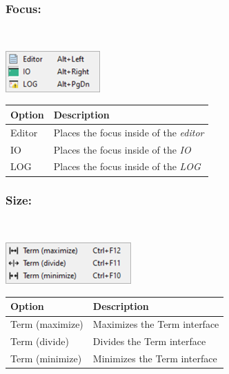 \hypertarget{menu_r_term_focus}{}
\subsubsection{Focus:}\\

\includegraphics[scale=0.8]{./res/menu_r_term_focus.png}\\

\begin{scriptsize}
  \begin{tabularx}{\textwidth}{>{\hsize=0.3\hsize}X>{\hsize=0.7\hsize}X}\\
    \hline
    \textbf{Option} & \textbf{Description} \\
    \hline
    Editor & Places the focus inside of the \textit{editor} \\
    IO & Places the focus inside of the \textit{IO} \\
    LOG & Places the focus inside of the \textit{LOG} \\
    \hline
  \end{tabularx}
\end{scriptsize}

\hypertarget{menu_r_term_size}{}
\subsubsection{Size:}\\

\includegraphics[scale=0.8]{./res/menu_r_term_size.png}\\

\begin{scriptsize}
  \begin{tabularx}{\textwidth}{>{\hsize=0.3\hsize}X>{\hsize=0.7\hsize}X}\\
    \hline
    \textbf{Option} & \textbf{Description} \\
    \hline
    Term (maximize) & Maximizes the Term interface \\
    Term (divide) & Divides the Term interface \\
    Term (minimize) & Minimizes the Term interface \\
    \hline
  \end{tabularx}
\end{scriptsize}

